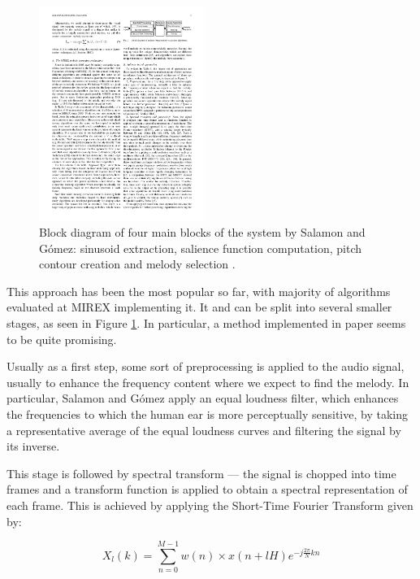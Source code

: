 \begin{figure}
  \vspace{-60pt}

  \begin{center}
    \includegraphics[width=0.48\textwidth]{Figures/salienceoveralldiagram}
  \end{center}
  \caption{Block diagram of four main blocks of the system by Salamon and G\'{o}mez: sinusoid extraction, salience function computation, pitch contour creation and melody selection \cite{comparison}.}
  \label{fig:3stepsalience}
\end{figure}

This approach has been the most popular so far, with majority of algorithms evaluated at MIREX implementing it. It and can be split into several smaller stages, as seen in Figure \ref{fig:3stepsalience}. In particular, a method implemented in paper \cite{salamon} seems to be quite promising.

Usually as a first step, some sort of preprocessing is applied to the audio signal, usually to enhance the frequency content where we expect to find the melody. In particular, Salamon and G\'{o}mez apply an equal loudness filter, which enhances the frequencies to which the human ear is more perceptually sensitive, by taking a representative average of the equal loudness curves and filtering the signal by its inverse. 

This stage is followed by spectral transform — the signal is chopped into time frames and a transform function is applied to obtain a spectral representation of each frame.
This is achieved by applying the Short-Time Fourier Transform given by:

\begin{equation}
X_{l}(k) = \sum_{n=0}^{M-1} w(n) \times x(n + lH) e^{-j\frac{2 \pi}{N}kn}
\end{equation}


